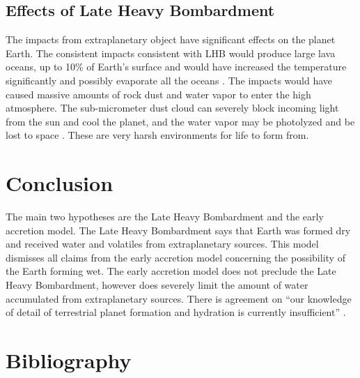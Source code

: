 \documentclass{article}
\begin{document}
\subsection{Effects of Late Heavy Bombardment}
The impacts from extraplanetary object have significant effects on the planet Earth.
The consistent impacts consistent with LHB would produce large lava oceans, up to 10\% of Earth's surface  and would have increased the temperature significantly and possibly evaporate all the oceans \cite{LavaOcean}.
The impacts would have caused massive amounts of rock dust and water vapor to enter the high atmosphere. The sub-micrometer dust cloud can severely block incoming light from the sun and cool the planet, and the water vapor may be photolyzed and be lost to space \cite{ImpactDust}. 
These are very harsh environments for life to form from.


\section{Conclusion}

The main two hypotheses are the Late Heavy Bombardment and the early accretion model. The Late Heavy Bombardment says that Earth was formed dry and received water and volatiles from extraplanetary sources. This model dismisses all claims from the early accretion model concerning the possibility of the Earth forming wet. The early accretion model does not preclude the Late Heavy Bombardment, however does severely limit the amount of water accumulated from extraplanetary sources. There is agreement on “our knowledge of detail of terrestrial planet formation and hydration is currently insufficient” \cite{BOMB14}. 

\section{Bibliography}
{}

\end{document}
